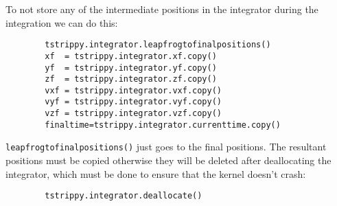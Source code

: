 \documentclass{article}
\begin{document}
    To not store any of the intermediate positions in the integrator during the integration we can do this: 
    \small
    \begin{lstlisting}
        tstrippy.integrator.leapfrogtofinalpositions()
        xf  = tstrippy.integrator.xf.copy()
        yf  = tstrippy.integrator.yf.copy()
        zf  = tstrippy.integrator.zf.copy()
        vxf = tstrippy.integrator.vxf.copy()
        vyf = tstrippy.integrator.vyf.copy()
        vzf = tstrippy.integrator.vzf.copy()
        finaltime=tstrippy.integrator.currenttime.copy()
    \end{lstlisting}
    \normalsize
    \texttt{leapfrogtofinalpositions()} just goes to the final positions. The resultant positions must be copied otherwise they will be deleted after deallocating the integrator, which must be done to ensure that the kernel doesn't crash:
    \small
    \begin{lstlisting}
        tstrippy.integrator.deallocate()
    \end{lstlisting}
    \normalsize




\end{document}
